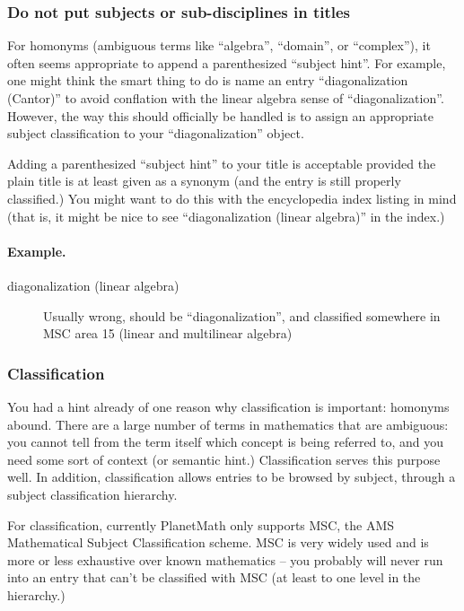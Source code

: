 \subsubsection{Do not put subjects or sub-disciplines in titles}
For homonyms (ambiguous terms like ``algebra'', ``domain'', or
``complex''), it often seems appropriate to append a parenthesized
``subject hint''. For example, one might think the smart thing to do
is name an entry ``diagonalization (Cantor)'' to avoid conflation with
the linear algebra sense of ``diagonalization''. However, the way this
should officially be handled is to assign an appropriate subject
classification to your ``diagonalization'' object.

Adding a parenthesized ``subject hint'' to your title is acceptable
provided the plain title is at least given as a synonym (and the entry
is still properly classified.) You might want to do this with the
encyclopedia index listing in mind (that is, it might be nice to see
``diagonalization (linear algebra)'' in the index.)

\paragraph{Example.}
\begin{description}
\item[diagonalization (linear algebra)] Usually wrong, should be
``diagonalization'', and classified somewhere in MSC area 15 (linear
and multilinear algebra)
\end{description}

\subsubsection*{Classification}
You had a hint already of one reason why classification is important:
homonyms abound. There are a large number of terms in mathematics that
are ambiguous: you cannot tell from the term itself which concept is
being referred to, and you need some sort of context (or semantic
hint.) Classification serves this purpose well. In addition,
classification allows entries to be browsed by subject, through a
subject classification hierarchy.

For classification, currently PlanetMath only supports MSC, the AMS
Mathematical Subject Classification scheme. MSC is very widely used
and is more or less exhaustive over known mathematics -- you probably
will never run into an entry that can't be classified with MSC (at
least to one level in the hierarchy.)

